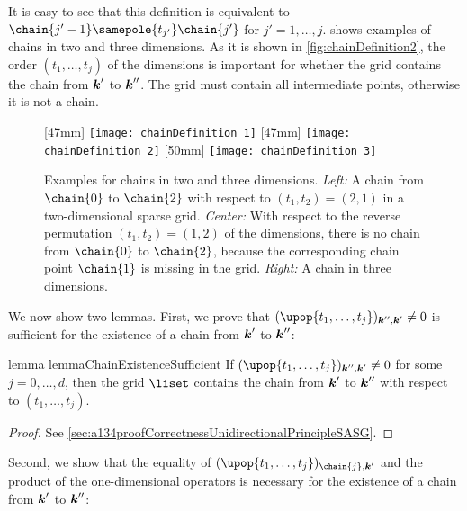 It is easy to see that this definition is equivalent to
$\chain{j'-1} \samepole{t_{j'}} \chain{j'}$ for $j' = 1, \dotsc, j$.
 shows examples of chains in
two and three dimensions.
As it is shown in \cref{fig:chainDefinition2},
the order $(t_1, \dotsc, t_j)$ of the dimensions is important
for whether the grid contains the chain from ${\boldsymbol{k}}'$ to ${\boldsymbol{k}}''$.
The grid must contain all intermediate points, otherwise
it is not a chain.

\begin{figure}
  [47mm]{%
    \texttt{[image: chainDefinition\_1]}%
  }%
  \hfill%
  [47mm]{%
    \texttt{[image: chainDefinition\_2]}%
  }%
  \hfill%
  [50mm]{%
    \texttt{[image: chainDefinition\_3]}%
  }%
  \caption[%
    Examples for the definition of chains%
  ]{%
    Examples for chains in two and three dimensions.
    \emph{Left:} A chain from $\chain{0}$ to $\chain{2}$
    with respect to $(t_1, t_2) = (2, 1)$ in a two-dimensional sparse grid.
    \emph{Center:}
    With respect to the reverse permutation
    $(t_1, t_2) = (1, 2)$ of the dimensions,
    there is no chain from $\chain{0}$ to $\chain{2}$,
    because the corresponding chain point $\chain{1}$ is missing in the grid.
    \emph{Right:} A chain in three dimensions.%
  }%
  \label{fig:chainDefinition}%
\end{figure}

We now show two lemmas.
First, we prove that $(\upop{t_1,\dotsc,t_j})_{\*k'',\*k'} \not= 0$
is sufficient for the existence of a chain from ${\boldsymbol{k}}'$ to ${\boldsymbol{k}}''$:

\begin{restatable}{%
  lemma%
}{%
  lemmaChainExistenceSufficient%
}
  \label{lemma:chainExistenceSufficient}
  If $(\upop{t_1,\dotsc,t_j})_{\*k'',\*k'} \not= 0$
  for some $j = 0, \dotsc, d$,
  then the grid $\liset$ contains the chain from ${\boldsymbol{k}}'$ to ${\boldsymbol{k}}''$
  with respect to $(t_1, \dotsc, t_j)$.
\end{restatable}

\begin{proof}
  See \cref{sec:a134proofCorrectnessUnidirectionalPrincipleSASG}.
\end{proof}

Second, we show that the equality of
$(\upop{t_1,\dotsc,t_j})_{\chain{j},\*k'}$ and the product of
the one-dimensional operators is necessary for the
existence of a chain from ${\boldsymbol{k}}'$ to ${\boldsymbol{k}}''$:

